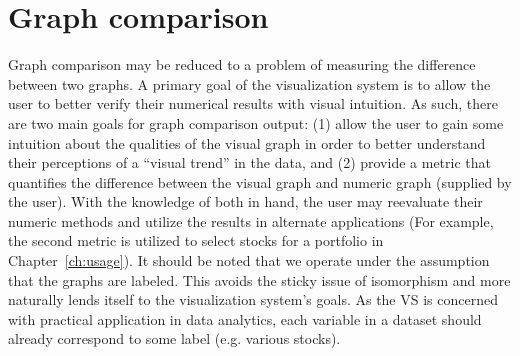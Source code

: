 \chapter{Graph comparison \label{ch:gc}}

Graph comparison may be reduced to a problem of measuring the difference 
between two graphs. 
A primary goal of the visualization system is to allow the user to better 
verify their numerical results with visual intuition. As such, there are two 
main goals for graph comparison output: (1) allow the user to gain some 
intuition about the qualities of the visual graph in order to better understand 
their perceptions of a ``visual trend'' in the data, and (2) provide a metric 
that quantifies the difference between the visual graph and numeric graph 
(supplied by the user). With the knowledge of both in hand, the user may 
reevaluate their numeric methods and utilize the results in alternate 
applications (For example, the second metric is utilized to select stocks for a 
portfolio in Chapter~\ref{ch:usage}). It should be noted that we operate under 
the assumption that the graphs are labeled. This avoids the sticky issue of 
isomorphism and more naturally lends itself to the visualization system's 
goals. As the VS is concerned with practical application in data 
analytics, each variable in a dataset should already correspond to some label 
(e.g. various stocks).




